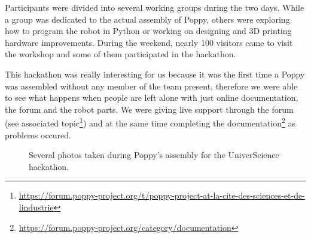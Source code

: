 Participants were divided into several working groups during the two days. While a group was dedicated to the actual assembly of Poppy, others were exploring how to program the robot in Python or working on designing and 3D printing hardware improvements. During the weekend, nearly 100 visitors came to visit the workshop and some of them participated in the hackathon.

This hackathon was really interesting for us because it was the first time a Poppy was assembled without any member of the team present, therefore we were able to see what happens when people are left alone with just online documentation, the forum and the robot parts.
We were giving live support through the forum (see associated topic\footnote{\url{https://forum.poppy-project.org/t/poppy-project-at-la-cite-des-sciences-et-de-lindustrie}}) and at the same time completing the documentation\footnote{\url{https://forum.poppy-project.org/category/documentation}} as problems occured.

\begin{figure}[p]
\centering
    \hfill
    \hfill
    \newline
    \hfill
    \newline
    \hfill
    \newline
    \hfill
    \caption{Several photos taken during Poppy's assembly for the UniverScience hackathon.}
    \label{fig:universience_workshop}
\end{figure}

